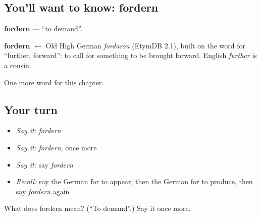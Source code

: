 \subsection*{You'll want to know: fordern}
\textbf{fordern} — \textquotedblleft{}to demand\textquotedblright{}.

\begin{cousinweb}
\textbf{fordern} $\leftarrow$ Old High German \emph{fordarōn} (EtymDB 2.1), built on the word for \textquotedblleft{}further, forward\textquotedblright{}: to call for something to be brought forward. English \emph{further} is a cousin.
\end{cousinweb}

\begin{grammarlens}[title={What you've built}]
One more word for this chapter.
\end{grammarlens}

\subsection*{Your turn}
\begin{itemize}
\raggedright
  \item \emph{Say it:} \emph{fordern}
  \item \emph{Say it:} \emph{fordern}, once more
  \item \emph{Say it:} say \emph{fordern}
  \item \emph{Recall:} say the German for to appear, then the German for to produce, then say \emph{fordern} again
\end{itemize}

\begin{tcolorbox}[breakable,colback=teal!4,colframe=teal!35!black,title={Before you move on}]
What does fordern mean? (\textquotedblleft{}To demand\textquotedblright{}.) Say it once more.
\end{tcolorbox}
